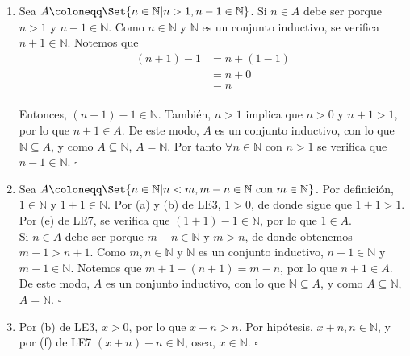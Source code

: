 \documentclass[11pt]{article}
\newcommand{\N}{\mathbb{N}}
\let\set\Set
\begin{document}
\begin{enumerate}[label=\alph*)]
    \item Sea $A \coloneqq \set{n\in \N | n>1, n-1\in \N}$. Si $n\in A$ debe ser porque $n>1$ y $n-1\in \N$. Como $n\in \N$ y $\N$ es un conjunto inductivo, se verifica $n+1\in\N$. Notemos que \begin{align*}
        (n+1)-1 &= n+(1-1) \\
        &= n+ 0\\
        &= n
    \end{align*}\\
    Entonces, $(n+1)-1\in \N$. También, $n>1$ implica que $n>0$ y $n+1>1$, por lo que $n+1\in A$. De este modo, $A$ es un conjunto inductivo, con lo que $\N \subseteq A$, y como $A\subseteq \N$, $A=\N$. Por tanto $\forall n\in \N$ con $n>1$ se verifica que $n-1\in \N$. \mbox{}\hfill $\square$

    \item Sea $A \coloneqq \set{n\in \N| n<m, m-n\in\N \ \text{con} \ m\in\N}$. Por definición, $1\in \N$ y $1+1\in \N$. Por (a) y (b) de LE3, $1>0$, de donde sigue que $1+1>1$. Por (e) de LE7, se verifica que $(1+1)-1\in \N$, por lo que $1\in A$. \\[5pt] Si $n \in A$ debe ser porque $m-n\in \N$ y $m>n$, de donde obtenemos $m+1>n+1$. Como $m,n\in \N$ y $\N$ es un conjunto inductivo, $n+1\in \N$ y $m+1 \in \N$. Notemos que $m+1-(n+1)=m-n$, por lo que $n+1\in A$. De este modo, $A$ es un conjunto inductivo, con lo que $\N \subseteq A$, y como $A\subseteq \N$, $A=\N$. \mbox{}\hfill $\square$ 
    
    
    \item Por (b) de LE3, $x>0$, por lo que $x+n>n$. Por hipótesis, $x+n, n\in \N$, y por (f) de LE7 $(x+n)-n \in \N$, osea, $x\in \N$. \mbox{}\hfill $\square$
    

\end{enumerate}
\end{document}
